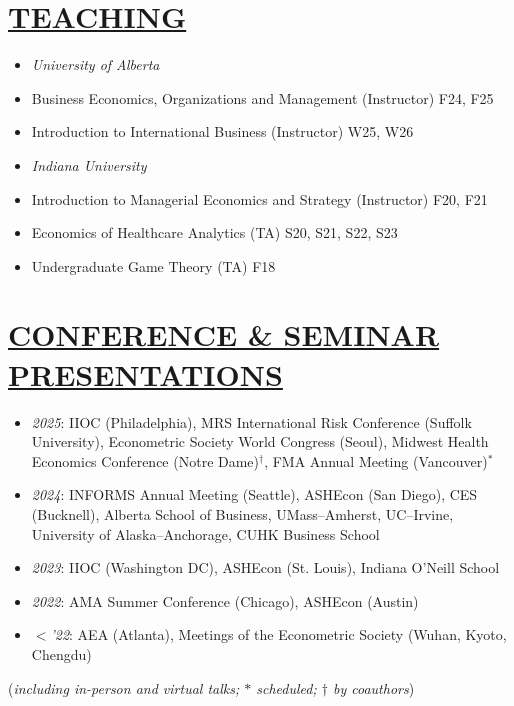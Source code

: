 \documentclass{res}
\begin{document}
\begin{resume}
\section{\large{\ul{TEACHING}}}
\vspace{1.8em}
\begin{itemize}[leftmargin=15pt,labelindent=-15pt,itemindent=-15pt,itemsep=0.1em]
\item[] \textit{University of Alberta}
    \item[] \hspace{13pt} Business Economics, Organizations and Management  (Instructor) \hfill F24, F25
    \item[] \hspace{13pt} Introduction to International Business (Instructor) \hfill W25, W26
\item[] \textit{Indiana University}
    \item[] \hspace{13pt} Introduction to Managerial Economics and Strategy (Instructor) \hfill F20, F21
    \item[] \hspace{13pt} Economics of Healthcare Analytics (TA) \hfill S20, S21, S22, S23
    \item[] \hspace{13pt} Undergraduate Game Theory (TA) \hfill F18
\end{itemize}

\section{\large{\ul{CONFERENCE \& SEMINAR PRESENTATIONS}}}
\vspace{1.8em}
\begin{itemize}[leftmargin=15pt,labelindent=-15pt,itemindent=-15pt,itemsep=0.1em]
\item[] \textit{2025}: IIOC (Philadelphia), MRS International Risk Conference (Suffolk University), Econometric Society World Congress (Seoul), Midwest Health Economics Conference (Notre Dame)$^{\dagger}$, FMA Annual Meeting (Vancouver)$^{*}$
\item[] \textit{2024}: INFORMS Annual Meeting (Seattle), ASHEcon (San Diego), CES (Bucknell), Alberta School of Business, UMass–Amherst, UC–Irvine, University of Alaska–Anchorage, CUHK Business School
\item[] \textit{2023}: IIOC (Washington DC), ASHEcon (St. Louis), Indiana O'Neill School 
\item[] \textit{2022}: AMA Summer Conference (Chicago), ASHEcon (Austin) 
\item[] \textit{$<$'22}: AEA (Atlanta), Meetings of the Econometric Society (Wuhan, Kyoto, Chengdu)
\end{itemize}
\hfill {\small (\textit{including in-person and virtual talks; $*$ scheduled; $\dagger$ by coauthors})}

\end{resume}
\end{document}
